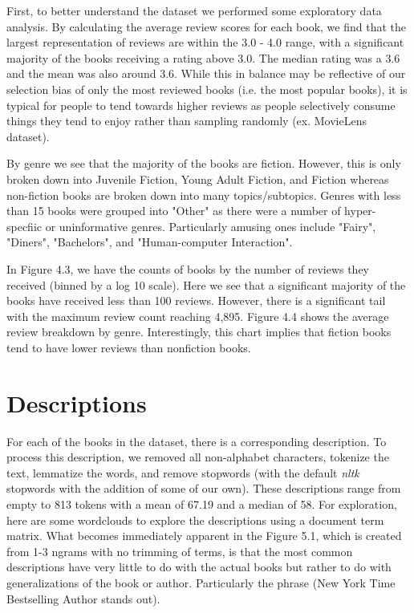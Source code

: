 \documentclass[12pt]{article}
\numberwithin{equation}{section}
\begin{document}
First, to better understand the dataset we performed some exploratory data analysis. By calculating the average review scores for each book, we find that the largest representation of reviews are within the 3.0 - 4.0 range, with a significant majority of the books receiving a rating above 3.0. The median rating was a 3.6 and the mean was also around 3.6. While this in balance may be reflective of our selection bias of only the most reviewed books (i.e. the most popular books), it is typical for people to tend towards higher reviews as people selectively consume things they tend to enjoy rather than sampling randomly (ex. MovieLens dataset).

By genre we see that the majority of the books are fiction. However, this is only broken down into Juvenile Fiction, Young Adult Fiction, and Fiction whereas non-fiction books are broken down into many topics/subtopics. Genres with less than 15 books were grouped into "Other" as there were a number of hyper-specfiic or uninformative genres. Particularly amusing ones include "Fairy", "Diners", "Bachelors", and "Human-computer Interaction".

In Figure 4.3, we have the counts of books by the number of reviews they received (binned by a log 10 scale). Here we see that a significant majority of the books have received less than 100 reviews. However, there is a significant tail with the maximum review count reaching 4,895. Figure 4.4 shows the average review breakdown by genre. Interestingly, this chart implies that fiction books tend to have lower reviews than nonfiction books.


\section{Descriptions}

For each of the books in the dataset, there is a corresponding description.  To process this description, we removed all non-alphabet characters, tokenize the text, lemmatize the words, and remove stopwords (with the default \textit{nltk} stopwords with the addition of some of our own). These descriptions range from empty to 813 tokens with a mean of 67.19 and a median of 58. For exploration, here are some wordclouds to explore the descriptions using a document term matrix. What becomes immediately apparent in the Figure 5.1, which is created from 1-3 ngrams with no trimming of terms, is that the most common descriptions have very little to do with the actual books but rather to do with generalizations of the book or author. Particularly the phrase (New York Time Bestselling Author stands out). 
\end{document}
